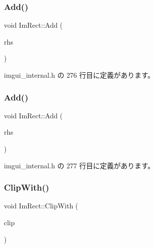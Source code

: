 \subsubsection{\texorpdfstring{Add()}{Add()}\hspace{0.1cm}{\footnotesize\ttfamily [1/2]}}
{\footnotesize\ttfamily void Im\+Rect\+::\+Add (\begin{DoxyParamCaption}\item[{const \mbox{\hyperlink{struct_im_vec2}{Im\+Vec2}} \&}]{rhs }\end{DoxyParamCaption})\hspace{0.3cm}{\ttfamily [inline]}}



 imgui\+\_\+internal.\+h の 276 行目に定義があります。

\mbox{\label{struct_im_rect_a9bcb65fd17843c74555291a522e9ebdf}} 
\subsubsection{\texorpdfstring{Add()}{Add()}\hspace{0.1cm}{\footnotesize\ttfamily [2/2]}}
{\footnotesize\ttfamily void Im\+Rect\+::\+Add (\begin{DoxyParamCaption}\item[{const \mbox{\hyperlink{struct_im_rect}{Im\+Rect}} \&}]{rhs }\end{DoxyParamCaption})\hspace{0.3cm}{\ttfamily [inline]}}



 imgui\+\_\+internal.\+h の 277 行目に定義があります。

\mbox{\label{struct_im_rect_a5e220ababe2fa079638aab8f4b0b8ace}} 
\subsubsection{\texorpdfstring{Clip\+With()}{ClipWith()}}
{\footnotesize\ttfamily void Im\+Rect\+::\+Clip\+With (\begin{DoxyParamCaption}\item[{const \mbox{\hyperlink{struct_im_rect}{Im\+Rect}} \&}]{clip }\end{DoxyParamCaption})\hspace{0.3cm}{\ttfamily [inline]}}



